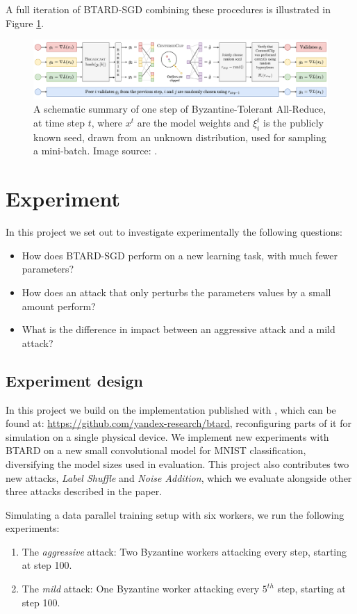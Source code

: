 \documentclass{article}
\begin{document}
A full iteration of BTARD-SGD combining these procedures is illustrated in Figure \ref{fig:BTARD-scheme}.
\begin{figure}[h]
\centering
\includegraphics[width=\textwidth]{figs/btard_scheme.png}
\caption{A schematic summary of one step of Byzantine-Tolerant All-Reduce, at time step $t$, where $x^t$ are the model weights and $\xi_{i}^{t}$ is the publicly known seed, drawn from an unknown distribution, used for sampling a mini-batch. Image source: \cite{gorbunov2021secure}.}
\label{fig:BTARD-scheme}
\end{figure}

\section{Experiment}
\label{sec:experiment}

In this project we set out to investigate experimentally the following questions:
\begin{itemize}
    \item How does BTARD-SGD perform on a new learning task, with much fewer parameters?
    \item How does an attack that only perturbs the parameters values by a small amount perform?
    \item What is the difference in impact between an aggressive attack and a mild attack?
\end{itemize}
\subsection{Experiment design}
\label{sec:experiment-design}
In this project we build on the implementation published with \cite{gorbunov2021secure}, which can be found at: \url{https://github.com/yandex-research/btard}, reconfiguring parts of it for simulation on a single physical device. We implement new experiments with BTARD on a new small convolutional model for MNIST classification, diversifying the model sizes used in evaluation. This project also contributes two new attacks, \textit{Label Shuffle} and \textit{Noise Addition}, which we evaluate alongside other three attacks described in the paper.

Simulating a data parallel training setup with six workers, we run the following experiments:
\begin{enumerate}[label=\Alph*]
\item The \textit{aggressive} attack: Two Byzantine workers attacking every step, starting at step 100.
\item The \textit{mild} attack: One Byzantine worker attacking every $5^{th}$ step, starting at step 100.
\end{enumerate}
\end{document}
